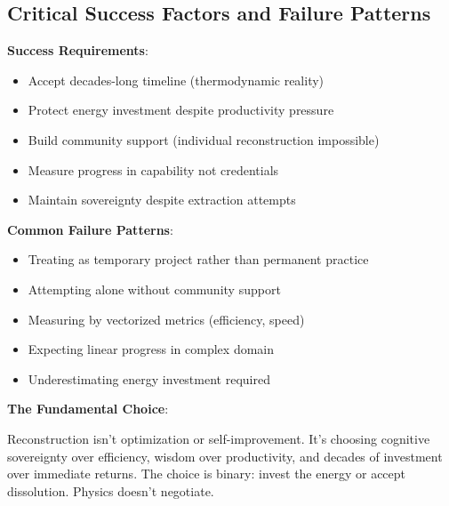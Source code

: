 \subsection{Critical Success Factors and Failure Patterns}

\textbf{Success Requirements}:
\begin{itemize}
\item Accept decades-long timeline (thermodynamic reality)
\item Protect energy investment despite productivity pressure
\item Build community support (individual reconstruction impossible)
\item Measure progress in capability not credentials
\item Maintain sovereignty despite extraction attempts
\end{itemize}

\textbf{Common Failure Patterns}:
\begin{itemize}
\item Treating as temporary project rather than permanent practice
\item Attempting alone without community support
\item Measuring by vectorized metrics (efficiency, speed)
\item Expecting linear progress in complex domain
\item Underestimating energy investment required
\end{itemize}

\textbf{The Fundamental Choice}:

Reconstruction isn't optimization or self-improvement. It's choosing cognitive sovereignty over efficiency, wisdom over productivity, and decades of investment over immediate returns. The choice is binary: invest the energy or accept dissolution. Physics doesn't negotiate.
